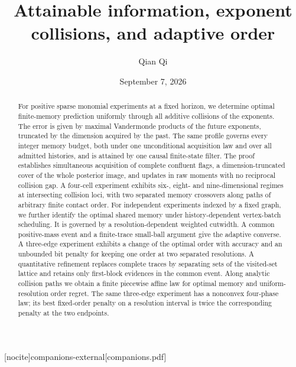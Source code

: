 
[nocite]{companions-external}[companions.pdf]
\title[Attainable information and adaptive order]{Attainable information, exponent collisions, and adaptive order}
\author{Qian Qi}
\date{September 7, 2026}

\begin{abstract}
For positive sparse monomial experiments at a fixed horizon, we determine
optimal finite-memory prediction uniformly through all additive
collisions of the exponents. The error is given by maximal Vandermonde
products of the future exponents, truncated by the dimension acquired
by the past. The same profile governs every integer memory budget,
both under one unconditional acquisition law and over all admitted
histories, and is attained by one causal finite-state filter.
The proof establishes simultaneous acquisition of complete confluent
flags, a dimension-truncated cover of the whole posterior image, and
updates in raw moments with no reciprocal collision gap. A
four-cell experiment exhibits six-, eight- and nine-dimensional
regimes at intersecting collision loci, with two separated memory
crossovers along paths of arbitrary finite contact order.
For independent experiments indexed by a fixed graph, we further identify
the optimal shared memory under history-dependent vertex-batch scheduling.
It is governed by a resolution-dependent weighted cutwidth. A common
positive-mass event and a finite-trace small-ball argument give the
adaptive converse. A three-edge experiment exhibits a change of the
optimal order with accuracy and an unbounded bit penalty for keeping
one order at two separated resolutions.
A quantitative refinement replaces complete traces by separating sets
of the visited-set lattice and retains only first-block evidences in
the common event. Along analytic collision paths we obtain a finite
piecewise affine law for optimal memory and uniform-resolution order
regret. The same three-edge experiment has a nonconvex four-phase law;
its best fixed-order penalty on a resolution interval is twice the
corresponding penalty at the two endpoints.
\end{abstract}
\maketitle








